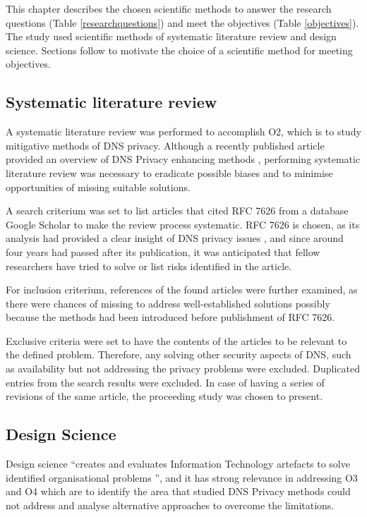 
This chapter describes the chosen scientific methods to answer the research questions (Table \ref{researchquestions}) and meet the objectives (Table \ref{objectives}).
The study used scientific methods of systematic literature review and design science.
Sections follow to motivate the choice of a scientific method for meeting objectives.
\subsection{Systematic literature review}
A systematic literature review was performed to accomplish O2, which is to study mitigative methods of DNS privacy. Although a recently published article provided an overview of DNS Privacy enhancing methods \cite{van2018privacy}, performing systematic literature review was necessary to eradicate possible biases and to minimise opportunities of missing suitable solutions.

A search criterium was set to list articles that cited RFC 7626 from a database Google Scholar to make the review process systematic. RFC 7626 is chosen, as its analysis had provided a clear insight of DNS privacy issues \cite{rfc7626}, and since around four years had passed after its publication, it was anticipated that fellow researchers have tried to solve or list risks identified in the article.

For inclusion criterium, references of the found articles were further examined, as there were chances of missing to address well-established solutions possibly because the methods had been introduced before publishment of RFC 7626.

Exclusive criteria were set to have the contents of the articles to be relevant to the defined problem. Therefore, any solving other security aspects of DNS, such as availability but not addressing the privacy problems were excluded.
Duplicated entries from the search results were excluded.
In case of having a series of revisions of the same article, the proceeding study was chosen to present.

\subsection{Design Science}
Design science ``creates and evaluates Information Technology artefacts to solve identified organisational problems \cite{von2004design}'', and it has strong relevance in addressing O3 and O4 which are to identify the area that studied DNS Privacy methods could not address and analyse alternative approaches to overcome the limitations.

